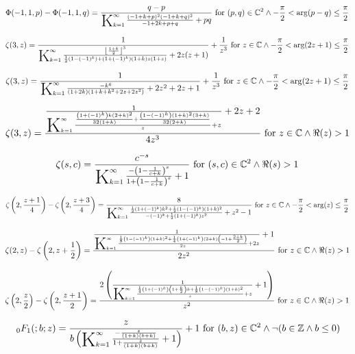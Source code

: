 \documentclass{article}
\newcommand{\bigK}{\mathop{\raisebox{-5pt}{\huge K}}}
\begin{document}
\[\Phi (-1,1,p)-\Phi (-1,1,q)=\frac{q-p}{\bigK_{k=1}^{\infty}\frac{(-1+k+p)^2 (-1+k+q)^2}{-1+2 k+p+q}+p q}\text{ for }(p,q)\in \mathbb{C}^2\land -\frac{\pi }{2}<\arg (p-q)\leq \frac{\pi }{2}\] 

\[\zeta (3,z)=\frac{1}{\bigK_{k=1}^{\infty}\frac{\left\lfloor \frac{1+k}{2}\right\rfloor ^3}{\frac{1}{2} \left(1-(-1)^k\right)+\left(1+(-1)^k\right) (1+k) z (1+z)}+2 z (z+1)}+\frac{1}{z^3}\text{ for }z\in \mathbb{C}\land -\frac{\pi }{2}<\arg (2 z+1)\leq \frac{\pi }{2}\] 

\[\zeta (3,z)=\frac{1}{\bigK_{k=1}^{\infty}\frac{-k^6}{(1+2 k) \left(1+k+k^2+2 z+2 z^2\right)}+2 z^2+2 z+1}+\frac{1}{z^3}\text{ for }z\in \mathbb{C}\land -\frac{\pi }{2}<\arg (2 z+1)\leq \frac{\pi }{2}\] 

\[\zeta (3,z)=\frac{\frac{1}{\bigK_{k=1}^{\infty}\frac{\frac{\left(1+(-1)^k\right) k (2+k)^2}{32 (1+k)}+\frac{\left(1-(-1)^k\right) (1+k)^2 (3+k)}{32 (2+k)}}{z}+z}+2 z+2}{4 z^3}\text{ for }z\in \mathbb{C}\land \Re(z)>1\] 

\[\zeta (s,c)=\frac{c^{-s}}{\bigK_{k=1}^{\infty}\frac{-\left(1-\frac{1}{c+k}\right)^s}{1+\left(1-\frac{1}{c+k}\right)^s}+1}\text{ for }(s,c)\in \mathbb{C}^2\land \Re(s)>1\] 

\[\zeta \left(2,\frac{z+1}{4}\right)-\zeta \left(2,\frac{z+3}{4}\right)=\frac{8}{\bigK_{k=1}^{\infty}\frac{\frac{1}{2} \left(1+(-1)^k\right) k^2+\frac{1}{2} \left(1-(-1)^k\right) (1+k)^2}{-(-1)^k+\frac{1}{2} \left(1+(-1)^k\right) z^2}+z^2-1}\text{ for }z\in \mathbb{C}\land -\frac{\pi }{2}<\arg (z)\leq \frac{\pi }{2}\] 

\[\zeta (2,z)-\zeta \left(2,z+\frac{1}{2}\right)=\frac{\frac{1}{\bigK_{k=1}^{\infty}\frac{\frac{1}{8} \left(1-(-1)^k\right) (1+k)^2+\frac{1}{4} \left(1+(-1)^k\right) (2+k) \left(-1+\frac{2+k}{2}\right)}{2 z}+2 z}+1}{2 z^2}\text{ for }z\in \mathbb{C}\land \Re(z)>1\] 

\[\zeta \left(2,\frac{z}{2}\right)-\zeta \left(2,\frac{z+1}{2}\right)=\frac{2 \left(\frac{1}{\bigK_{k=1}^{\infty}\frac{\frac{1}{4} \left(1+(-1)^k\right) \left(1+\frac{k}{2}\right) k+\frac{1}{8} \left(1-(-1)^k\right) (1+k)^2}{z}+z}+1\right)}{z^2}\text{ for }z\in \mathbb{C}\land \Re(z)>1\] 

\[\, _0F_1(;b;z)=\frac{z}{b \left(\bigK_{k=1}^{\infty}\frac{-\frac{z}{(1+k) (b+k)}}{1+\frac{z}{(1+k) (b+k)}}+1\right)}+1\text{ for }(b,z)\in \mathbb{C}^2\land \neg (b\in \mathbb{Z}\land b\leq 0)\] 
\end{document}
